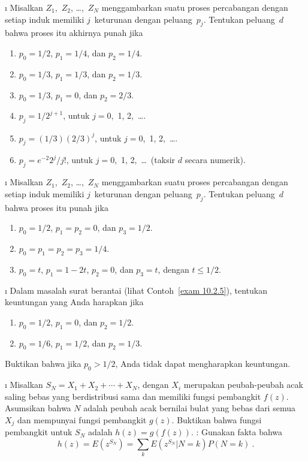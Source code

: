 \exercises
\begin{LJSItem}

\i\label{exer 10.2.1} Misalkan $Z_1$,~$Z_2$, \ldots,~$Z_N$ menggambarkan suatu proses percabangan dengan 
setiap induk memiliki $j$~keturunan dengan peluang~$p_j$.  Tentukan peluang~$d$ 
bahwa proses itu akhirnya punah jika
\begin{enumerate}
\item $p_0 = 1/2$, $p_1 = 1/4$, dan $p_2 = 1/4$.

\item $p_0 = 1/3$, $p_1 = 1/3$, dan $p_2 = 1/3$.

\item $p_0 = 1/3$, $p_1 = 0$, dan $p_2 = 2/3$.

\item $p_j = 1/2^{j + 1}$, untuk $j = 0$,~1, 2,~\ldots.

\item $p_j = (1/3)(2/3)^j$, untuk $j = 0$,~1, 2,~\ldots.

\item $p_j = e^{-2} 2^j/j!$, untuk $j = 0$,~1, 2,~\ldots\ (taksir $d$
secara numerik).
\end{enumerate}

\i\label{exer 10.2.2} Misalkan $Z_1$,~$Z_2$, \ldots,~$Z_N$ menggambarkan suatu proses percabangan dengan 
setiap induk memiliki $j$~keturunan dengan peluang~$p_j$.  Tentukan peluang~$d$ bahwa
proses itu punah jika
\begin{enumerate}
\item $p_0 = 1/2$, $p_1 = p_2 = 0$, dan $p_3 = 1/2$.

\item $p_0 = p_1 = p_2 = p_3 = 1/4$.

\item $p_0 = t$, $p_1 = 1 - 2t$, $p_2 = 0$, dan $p_3 = t$, dengan $t \leq
1/2$.
\end{enumerate}

\i\label{exer 10.2.3} Dalam masalah surat berantai (lihat Contoh~\ref{exam 10.2.5}), tentukan 
keuntungan yang Anda harapkan jika
\begin{enumerate}
\item $p_0 = 1/2$, $p_1 = 0$, dan $p_2 = 1/2$.

\item $p_0 = 1/6$, $p_1 = 1/2$, dan $p_2 = 1/3$.
\end{enumerate}
Buktikan bahwa jika $p_0 > 1/2$, Anda tidak dapat mengharapkan keuntungan.

\i\label{exer 10.2.4} Misalkan $S_N = X_1 + X_2 +\cdots+ X_N$, dengan $X_i$ merupakan peubah-peubah acak saling bebas
yang berdistribusi sama dan memiliki fungsi pembangkit $f(z)$.  Asumsikan bahwa $N$ adalah peubah acak bernilai
bulat yang bebas dari semua $X_j$ dan mempunyai fungsi pembangkit $g(z)$. 
Buktikan bahwa fungsi pembangkit untuk $S_N$ adalah $h(z) = g(f(z))$.  :
Gunakan fakta bahwa
$$
h(z) = E(z^{S_N}) = \sum_k E(z^{S_N} | N = k) P(N = k)\ .
$$


\end{LJSItem}
